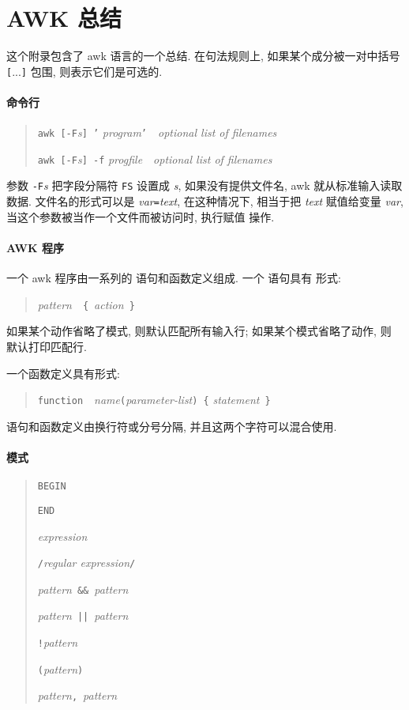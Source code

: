 \chapter{AWK 总结}
\label{chap:awk_summary}

这个附录包含了 awk 语言的一个总结. 在句法规则上, 如果某个成分被一对中括号
\verb'['...\verb']' 包围, 则表示它们是可选的.

\subsubsection{命令行}
\begin{quote}
    \texttt{awk [-F}\textit{s}\texttt{] '}%
    \textit{program}\texttt{'}\ \ \textit{optional list of filenames}

    \texttt{awk [-F}\textit{s}\texttt{] -f}
    \textit{progfile}\ \ \textit{optional list of filenames}
\end{quote}
参数 \texttt{-F}\textit{s} 把字段分隔符 \texttt{FS} 设置成 \textit{s},
如果没有提供文件名, awk 就从标准输入读取数据. 文件名的形式可以是 
\textit{var}\texttt{=}\textit{text}, 在这种情况下, 相当于把 \textit{text}
赋值给变量 \textit{var}, 当这个参数被当作一个文件而被访问时, 执行赋值
操作.

\subsubsection{AWK 程序}
一个 awk 程序由一系列的 \patact 语句和函数定义组成. 一个 \patact 语句具有
形式:
\begin{quote}
    \textit{pattern}\ \ \verb'{'\ \textit{action}\ \verb'}'
\end{quote}
如果某个动作省略了模式, 则默认匹配所有输入行; 如果某个模式省略了动作, 则
默认打印匹配行.

一个函数定义具有形式:
\begin{quote}
    \texttt{function}\ \
    \textit{name}\verb'('\textit{parameter-list}\verb') {'
        \textit{statement}\ \verb'}'
\end{quote}
\patact 语句和函数定义由换行符或分号分隔, 并且这两个字符可以混合使用.

\subsubsection{模式}
\begin{quote}
    \texttt{BEGIN}

    \texttt{END}

    \textit{expression}

    \verb'/'\textit{regular expression}\verb'/'

    \textit{pattern}\ \verb'&&'\ \textit{pattern}

    \textit{pattern}\ \verb'||'\ \textit{pattern}

    \verb'!'\textit{pattern}

    \verb'('\textit{pattern}\verb')'

    \textit{pattern}\verb','\ \textit{pattern}
\end{quote}

